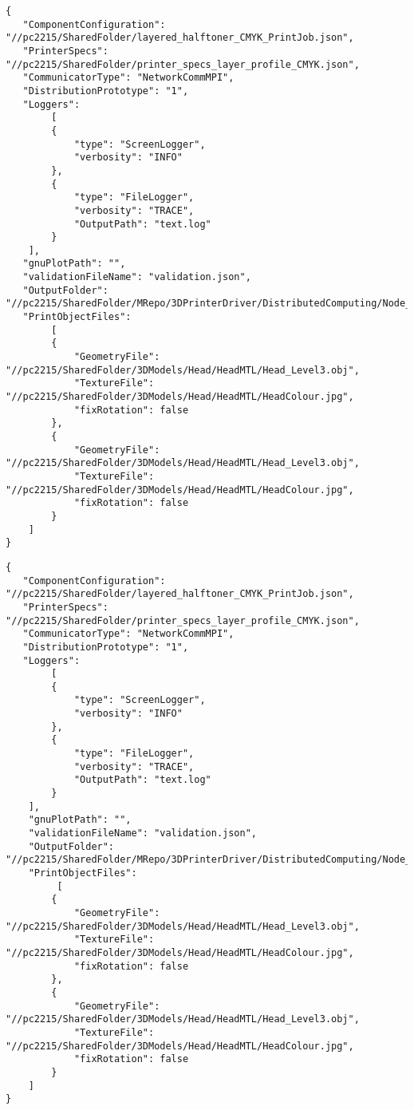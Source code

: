 \begin{lstlisting}[label={lst:SCF},caption={Slave Configuration file Node 2 }]
{
   "ComponentConfiguration": "//pc2215/SharedFolder/layered_halftoner_CMYK_PrintJob.json",
   "PrinterSpecs": "//pc2215/SharedFolder/printer_specs_layer_profile_CMYK.json",
   "CommunicatorType": "NetworkCommMPI",
   "DistributionPrototype": "1",
   "Loggers":
		[
        {
            "type": "ScreenLogger",
            "verbosity": "INFO"
        },
        {
            "type": "FileLogger",
            "verbosity": "TRACE",
            "OutputPath": "text.log"
        }
    ],
   "gnuPlotPath": "",
   "validationFileName": "validation.json",
   "OutputFolder": "//pc2215/SharedFolder/MRepo/3DPrinterDriver/DistributedComputing/Node_2/",
   "PrintObjectFiles":
		[
        {
            "GeometryFile": "//pc2215/SharedFolder/3DModels/Head/HeadMTL/Head_Level3.obj",
            "TextureFile": "//pc2215/SharedFolder/3DModels/Head/HeadMTL/HeadColour.jpg",
            "fixRotation": false
        },
        {
            "GeometryFile": "//pc2215/SharedFolder/3DModels/Head/HeadMTL/Head_Level3.obj",
            "TextureFile": "//pc2215/SharedFolder/3DModels/Head/HeadMTL/HeadColour.jpg",
            "fixRotation": false
        }
    ]
}
\end{lstlisting}

\begin{lstlisting}[label={lst:SCF2},caption={Slave Configuration file Node 1 }]
{
   "ComponentConfiguration": "//pc2215/SharedFolder/layered_halftoner_CMYK_PrintJob.json",
   "PrinterSpecs": "//pc2215/SharedFolder/printer_specs_layer_profile_CMYK.json",
   "CommunicatorType": "NetworkCommMPI",
   "DistributionPrototype": "1",
   "Loggers":
		[
        {
            "type": "ScreenLogger",
            "verbosity": "INFO"
        },
        {
            "type": "FileLogger",
            "verbosity": "TRACE",
            "OutputPath": "text.log"
        }
    ],
    "gnuPlotPath": "",
    "validationFileName": "validation.json",
    "OutputFolder": "//pc2215/SharedFolder/MRepo/3DPrinterDriver/DistributedComputing/Node_1/",
    "PrintObjectFiles":
		 [
        {
            "GeometryFile": "//pc2215/SharedFolder/3DModels/Head/HeadMTL/Head_Level3.obj",
            "TextureFile": "//pc2215/SharedFolder/3DModels/Head/HeadMTL/HeadColour.jpg",
            "fixRotation": false
        },
        {
            "GeometryFile": "//pc2215/SharedFolder/3DModels/Head/HeadMTL/Head_Level3.obj",
            "TextureFile": "//pc2215/SharedFolder/3DModels/Head/HeadMTL/HeadColour.jpg",
            "fixRotation": false
        }
    ]
}
\end{lstlisting}

